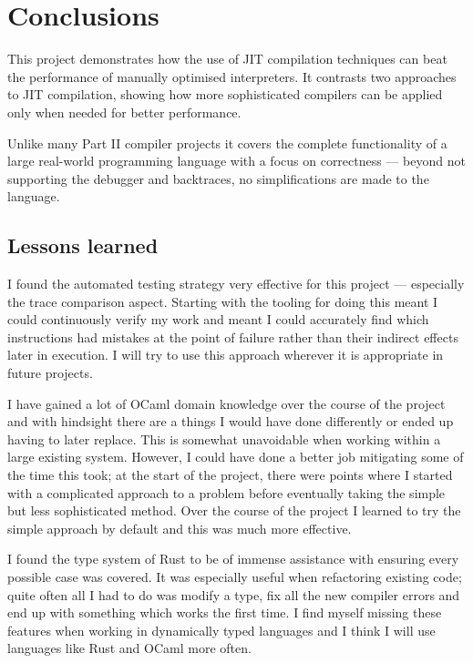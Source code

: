\chapter{Conclusions}

This project demonstrates how the use of JIT compilation techniques can beat the performance
of manually optimised interpreters. It contrasts two approaches to JIT compilation, showing how
more sophisticated compilers can be applied only when needed for better performance.

Unlike many Part II compiler projects it covers the complete functionality of a large real-world
programming language with a focus on correctness --- beyond not supporting the debugger and
backtraces, no simplifications are made to the language.

\section{Lessons learned}

I found the automated testing strategy very effective for this project --- especially the trace
comparison aspect. Starting with the tooling for doing this meant I could continuously verify my
work and meant I could accurately find which instructions had mistakes at the point of failure
rather than their indirect effects later in execution. I will try to use this approach wherever
it is appropriate in future projects.

I have gained a lot of OCaml domain knowledge over the course of the project and with hindsight
there are a things I would have done differently or ended up having to later replace.  This is
somewhat unavoidable when working within a large existing system. However, I could have done
a better job mitigating some of the time this took; at the start of the project, there were points
where I started with a complicated approach to a problem before eventually taking the simple but
less sophisticated method. Over the course of the project I learned to try the simple approach by
default and this was much more effective.

I found the type system of Rust to be of immense assistance with ensuring every possible case was
covered. It was especially useful when refactoring existing code; quite often all I had to do was
modify a type, fix all the new compiler errors and end up with something which works the first
time. I find myself missing these features when working in dynamically typed languages and I think
I will use languages like Rust and OCaml more often.

